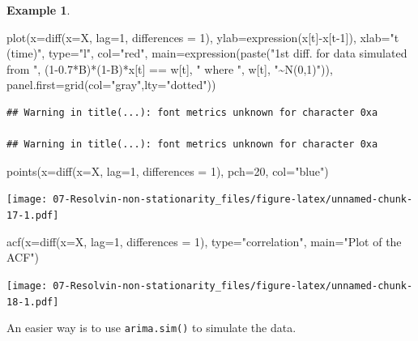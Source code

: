 \documentclass[
]{book}
\newenvironment{Shaded}{\begin{snugshade}}{\end{snugshade}}
\newcommand{\AttributeTok}[1]{\textcolor[rgb]{0.77,0.63,0.00}{#1}}
\newcommand{\DecValTok}[1]{\textcolor[rgb]{0.00,0.00,0.81}{#1}}
\newcommand{\FloatTok}[1]{\textcolor[rgb]{0.00,0.00,0.81}{#1}}
\newcommand{\FunctionTok}[1]{\textcolor[rgb]{0.00,0.00,0.00}{#1}}
\newcommand{\NormalTok}[1]{#1}
\newcommand{\SpecialCharTok}[1]{\textcolor[rgb]{0.00,0.00,0.00}{#1}}
\newcommand{\StringTok}[1]{\textcolor[rgb]{0.31,0.60,0.02}{#1}}
\theoremstyle{definition}
\theoremstyle{definition}
\newtheorem{example}{Example}[chapter]
\theoremstyle{definition}
\theoremstyle{definition}
\theoremstyle{remark}
\begin{document}
\begin{example}
\begin{Shaded}
\begin{Highlighting}[]
\FunctionTok{plot}\NormalTok{(}\AttributeTok{x=}\FunctionTok{diff}\NormalTok{(}\AttributeTok{x=}\NormalTok{X, }\AttributeTok{lag=}\DecValTok{1}\NormalTok{, }\AttributeTok{differences =} \DecValTok{1}\NormalTok{), }\AttributeTok{ylab=}\FunctionTok{expression}\NormalTok{(x[t]}\SpecialCharTok{{-}}\NormalTok{x[t}\DecValTok{{-}1}\NormalTok{]), }\AttributeTok{xlab=}\StringTok{"t (time)"}\NormalTok{, }\AttributeTok{type=}\StringTok{"l"}\NormalTok{, }\AttributeTok{col=}\StringTok{"red"}\NormalTok{, }\AttributeTok{main=}\FunctionTok{expression}\NormalTok{(}\FunctionTok{paste}\NormalTok{(}\StringTok{"1st diff. for data simulated from "}\NormalTok{, (}\DecValTok{1}\FloatTok{{-}0.7}\SpecialCharTok{*}\NormalTok{B)}\SpecialCharTok{*}\NormalTok{(}\DecValTok{1}\SpecialCharTok{{-}}\NormalTok{B)}\SpecialCharTok{*}\NormalTok{x[t] }\SpecialCharTok{==}\NormalTok{ w[t], }\StringTok{" where }
\StringTok{   "}\NormalTok{, w[t], }\StringTok{"\textasciitilde{}N(0,1)"}\NormalTok{)), }\AttributeTok{panel.first=}\FunctionTok{grid}\NormalTok{(}\AttributeTok{col=}\StringTok{"gray"}\NormalTok{,}\AttributeTok{lty=}\StringTok{"dotted"}\NormalTok{))}
\end{Highlighting}
\end{Shaded}

\begin{verbatim}
## Warning in title(...): font metrics unknown for character 0xa

## Warning in title(...): font metrics unknown for character 0xa
\end{verbatim}

\begin{Shaded}
\begin{Highlighting}[]
\FunctionTok{points}\NormalTok{(}\AttributeTok{x=}\FunctionTok{diff}\NormalTok{(}\AttributeTok{x=}\NormalTok{X, }\AttributeTok{lag=}\DecValTok{1}\NormalTok{, }\AttributeTok{differences =} \DecValTok{1}\NormalTok{), }\AttributeTok{pch=}\DecValTok{20}\NormalTok{, }\AttributeTok{col=}\StringTok{"blue"}\NormalTok{)}
\end{Highlighting}
\end{Shaded}

\texttt{[image: 07-Resolvin-non-stationarity\_files/figure-latex/unnamed-chunk-17-1.pdf]}

\begin{Shaded}
\begin{Highlighting}[]
\FunctionTok{acf}\NormalTok{(}\AttributeTok{x=}\FunctionTok{diff}\NormalTok{(}\AttributeTok{x=}\NormalTok{X, }\AttributeTok{lag=}\DecValTok{1}\NormalTok{, }\AttributeTok{differences =} \DecValTok{1}\NormalTok{), }\AttributeTok{type=}\StringTok{"correlation"}\NormalTok{, }\AttributeTok{main=}\StringTok{"Plot of the ACF"}\NormalTok{)}
\end{Highlighting}
\end{Shaded}

\texttt{[image: 07-Resolvin-non-stationarity\_files/figure-latex/unnamed-chunk-18-1.pdf]}

An easier way is to use \texttt{arima.sim()} to simulate the data.
\end{example}
\end{document}
